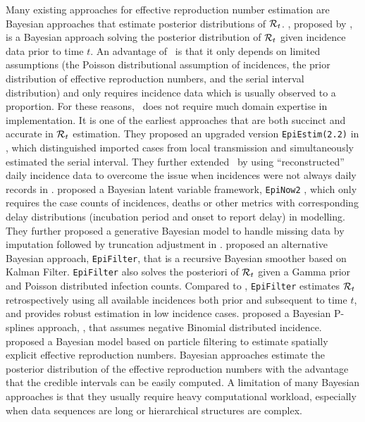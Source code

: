 Many existing approaches for effective reproduction number estimation are Bayesian approaches that estimate posterior distributions of $\mathcal{R}_t$. \EpiEstim \citep{cori2020package}, proposed by \cite{cori2013new}, is a Bayesian approach solving the posterior distribution of $\mathcal{R}_t$ given incidence data prior to time $t$. An advantage of \EpiEstim\ is that it only depends on limited assumptions (the Poisson distributional assumption of incidences, the prior distribution of effective reproduction numbers, and the serial interval distribution) and only requires incidence data which is usually observed to a proportion. For these reasons, \EpiEstim\ does not require much domain expertise in implementation. It is one of the earliest approaches that are both succinct and accurate in $\mathcal{R}_t$ estimation. They proposed an upgraded version \texttt{EpiEstim(2.2)} in \cite{thompson2019improved}, which distinguished imported cases from local transmission and simultaneously estimated the serial interval. They further extended \EpiEstim\ by using ``reconstructed'' daily incidence data to overcome the issue when incidences were not always daily records in \cite{nash2023estimating}. 
% 
\cite{abbott2020estimating} proposed a Bayesian latent variable framework, \texttt{EpiNow2} \citep{EpiNow2}, which only requires the case counts of incidences, deaths or other metrics with corresponding delay distributions (incubation period and onset to report delay) in modelling.  
They further proposed a generative Bayesian model to handle missing data by imputation followed by truncation adjustment in \cite{lison2023generative}. 
%
\cite{parag2021improved} proposed an alternative Bayesian approach, \texttt{EpiFilter}, that is a recursive Bayesian smoother based on Kalman Filter. \texttt{EpiFilter} also solves the posteriori of $\mathcal{R}_t$ given a Gamma prior and Poisson distributed infection counts. Compared to \EpiEstim, \texttt{EpiFilter} estimates $\mathcal{R}_t$ retrospectively using all available incidences both prior and subsequent to time $t$, and provides robust estimation in low incidence cases.  
\cite{gressani2022epilps} proposed a Bayesian P-splines approach, \EpiLPS, that assumes negative Binomial distributed incidence. 
\cite{trevisin2023spatially} proposed a Bayesian model based on particle filtering to estimate spatially explicit effective reproduction numbers.
%
Bayesian approaches estimate the posterior distribution of the effective reproduction numbers with the advantage that the credible intervals can be easily computed. A limitation of many Bayesian approaches is that they usually require heavy computational workload, especially when data sequences are long or hierarchical structures are complex.  %

